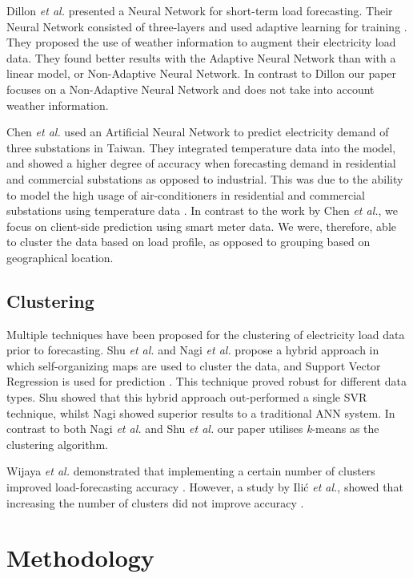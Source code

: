 Dillon \textit{et al.} presented a Neural Network for short-term load forecasting. Their Neural Network consisted of three-layers and used adaptive learning for training \cite{Dillon1991}. They proposed the use of weather information to augment their electricity load data. They found better results with the Adaptive Neural Network than with a linear model, or Non-Adaptive Neural Network. In contrast to Dillon our paper focuses on a Non-Adaptive Neural Network and does not take into account weather information.

Chen \textit{et al.} used an Artificial Neural Network to predict electricity demand of three substations in Taiwan. They integrated temperature data into the model, and showed a higher degree of accuracy when forecasting demand in residential and commercial substations as opposed to industrial. This was due to the ability to model the high usage of air-conditioners in residential and commercial substations using temperature data \cite{Chen1996}. In contrast to the work by Chen \textit{et al.}, we focus on client-side prediction using smart meter data. We were, therefore, able to cluster the data based on load profile, as opposed to grouping based on geographical location.


\subsection{Clustering}

Multiple techniques have been proposed for the clustering of electricity load data prior to forecasting. Shu \textit{et al.} and Nagi \textit{et al.} propose a hybrid approach in which self-organizing maps are used to cluster the data, and Support Vector Regression is used for prediction \cite{Shu2006, Tiong2008}. This technique proved robust for different data types. Shu showed that this hybrid approach out-performed a single SVR technique, whilst Nagi showed superior results to a traditional ANN system. In contrast to both Nagi \textit{et al.} and Shu \textit{et al.} our paper utilises \textit{k}-means as the clustering algorithm.

Wijaya \textit{et al.} demonstrated that implementing  a certain number of clusters improved load-forecasting accuracy \cite{Wijaya2010}. However, a study by Ili\'c \textit{et al.}, showed that increasing the number of clusters did not improve accuracy \cite{Ilic2013}.

\section{Methodology}

